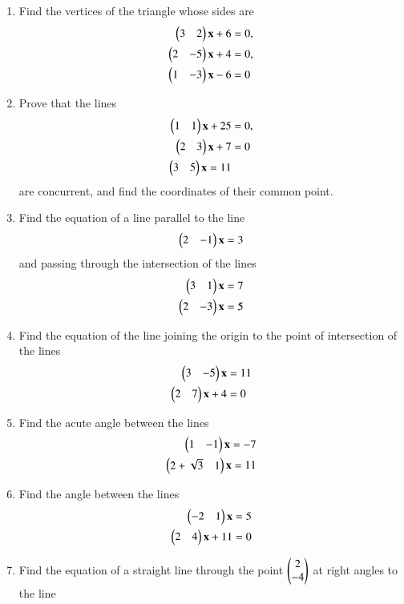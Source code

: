 \renewcommand{\theequation}{\theenumi}
\begin{enumerate}[label=\arabic*.,ref=\thesubsection.\theenumi]
\item Find the vertices of the triangle whose sides are
\begin{align}
\begin{pmatrix}3 & 2\end{pmatrix}\mathbf{x}+6 &= 0,
\\
 \begin{pmatrix}2 & -5\end{pmatrix}\mathbf{x}+4 &= 0,
\\
 \begin{pmatrix}1 & -3\end{pmatrix}\mathbf{x} -6 &= 0
\end{align}
\item Prove that the lines
\begin{align}
\begin{pmatrix}1 & 1\end{pmatrix}\mathbf{x}+25 &= 0, 
\\
\begin{pmatrix}2 & 3\end{pmatrix}\mathbf{x}+7 &= 0 
\\
\begin{pmatrix}3 & 5\end{pmatrix}\mathbf{x} = 11
\end{align}
%
are concurrent, and find the coordinates of their common point.
\item Find the equation of a line parallel to the line 
\begin{align}
\begin{pmatrix}2 & -1\end{pmatrix}\mathbf{x}=3
\end{align}
 and passing through the intersection of the lines
\begin{align}
\begin{pmatrix}3 & 1\end{pmatrix}\mathbf{x}&=7
\\
 \begin{pmatrix}2 & -3\end{pmatrix}\mathbf{x} &= 5
\end{align}
\item Find the equation of the line joining the origin to the point of intersection of the lines
\begin{align}
\begin{pmatrix}3&-5\end{pmatrix}\mathbf{x} &= 11
\\
 \begin{pmatrix}2&7\end{pmatrix}\mathbf{x}+4 &= 0
\end{align}
%
\item Find the acute angle between the lines
\begin{align}
\begin{pmatrix}1 & -1\end{pmatrix} \mathbf{x}=  - 7 
\\
 \begin{pmatrix}2+\sqrt{3}& 1\end{pmatrix} \mathbf{x}= 11
\end{align}
\item Find the angle between the lines
\begin{align}
\begin{pmatrix}-2 & 1\end{pmatrix} \mathbf{x}&= 5 
\\
 \begin{pmatrix}2 & 4\end{pmatrix} \mathbf{x}+ 11 &= 0
\end{align}
\renewcommand{\theequation}{\theenumi}
\item Find the equation of a straight line through the point $\begin{pmatrix}2\\-4\end{pmatrix}$ at right angles to the line 

\end{enumerate}
